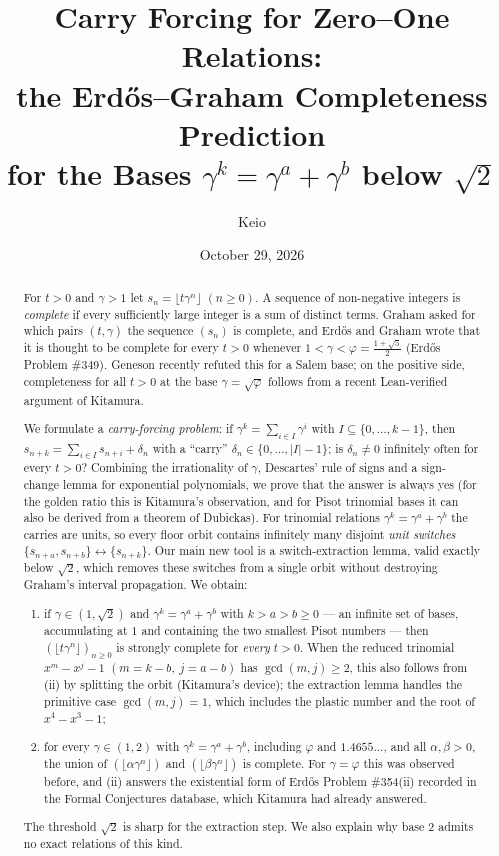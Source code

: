\documentclass[11pt]{amsart}
\title[Carry forcing and the Erd\H{o}s--Graham prediction]{Carry Forcing for Zero--One
Relations:\\ the Erd\H{o}s--Graham Completeness Prediction\\ for the Bases
$\gamma^k=\gamma^a+\gamma^b$ below $\sqrt2$}
\author{Keio}
\date{October 29, 2026}
\theoremstyle{definition}
\theoremstyle{remark}
\newcommand{\fl}[1]{\lfloor #1\rfloor}
\begin{document}
\begin{abstract}
For $t>0$ and $\gamma>1$ let $s_n=\fl{t\gamma^n}$ $(n\ge 0)$. A sequence of non-negative
integers is \emph{complete} if every sufficiently large integer is a sum of distinct terms.
Graham asked for which pairs $(t,\gamma)$ the sequence $(s_n)$ is complete, and Erd\H{o}s and
Graham wrote that it is thought to be complete for every $t>0$ whenever
$1<\gamma<\varphi=\frac{1+\sqrt5}{2}$ (Erd\H{o}s Problem \#349). Geneson recently refuted this
for a Salem base; on the positive side, completeness for all $t>0$ at the base
$\gamma=\sqrt\varphi$ follows from a recent Lean-verified argument of Kitamura.

We formulate a \emph{carry-forcing problem}: if $\gamma^k=\sum_{i\in I}\gamma^i$ with
$I\subseteq\{0,\dots,k-1\}$, then $s_{n+k}=\sum_{i\in I}s_{n+i}+\delta_n$ with a ``carry''
$\delta_n\in\{0,\dots,|I|-1\}$; is $\delta_n\neq0$ infinitely often for every $t>0$? Combining
the irrationality of $\gamma$, Descartes' rule of signs and a sign-change lemma for
exponential polynomials, we prove that the answer is always yes (for the golden ratio this is
Kitamura's observation, and for Pisot trinomial bases it can also be derived from a theorem
of Dubickas). For trinomial relations $\gamma^k=\gamma^a+\gamma^b$ the carries are units, so
every floor orbit contains infinitely many disjoint \emph{unit switches}
$\{s_{n+a},s_{n+b}\}\leftrightarrow\{s_{n+k}\}$. Our main new tool is a switch-extraction lemma,
valid exactly below $\sqrt2$, which removes these switches from a single orbit without
destroying Graham's interval propagation. We obtain:
\begin{enumerate}[label=(\roman*),leftmargin=2em]
\item if $\gamma\in(1,\sqrt2)$ and $\gamma^k=\gamma^a+\gamma^b$ with $k>a>b\ge0$ --- an infinite
set of bases, accumulating at $1$ and containing the two smallest Pisot numbers --- then
$(\fl{t\gamma^n})_{n\ge0}$ is strongly complete for \emph{every} $t>0$. When the reduced
trinomial $x^m-x^j-1$ $(m=k-b,\ j=a-b)$ has $\gcd(m,j)\ge2$, this also follows from (ii) by
splitting the orbit (Kitamura's device); the extraction lemma handles the primitive case
$\gcd(m,j)=1$, which includes the plastic number and the root of $x^4-x^3-1$;
\item for every $\gamma\in(1,2)$ with $\gamma^k=\gamma^a+\gamma^b$, including $\varphi$ and
$1.4655\ldots$, and all $\alpha,\beta>0$, the union of $(\fl{\alpha\gamma^n})$ and
$(\fl{\beta\gamma^n})$ is complete. For $\gamma=\varphi$ this was observed before, and (ii)
answers the existential form of Erd\H{o}s Problem \#354(ii) recorded in the Formal Conjectures
database, which Kitamura had already answered.
\end{enumerate}
The threshold $\sqrt2$ is sharp for the extraction step. We also explain why base $2$ admits
no exact relations of this kind.
\end{abstract}
\end{document}
